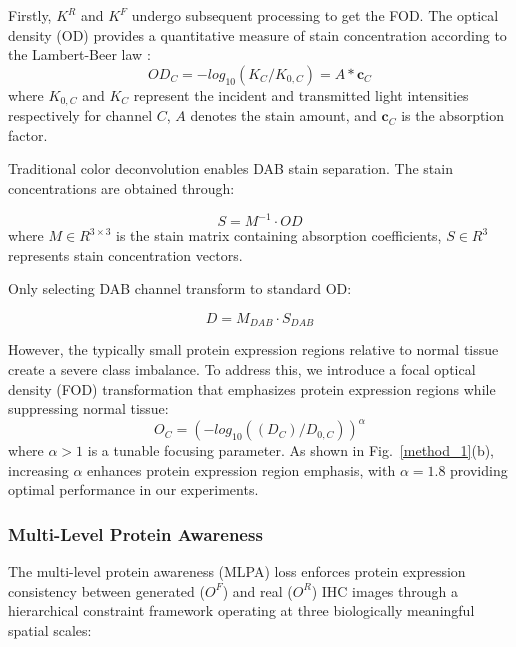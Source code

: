 \documentclass[journal,twoside,web]{ieeecolor}
\begin{document}
Firstly, $K^R$ and $K^F$ undergo subsequent processing to get the FOD.
The optical density (OD) provides a quantitative measure of stain concentration according to the Lambert-Beer law \cite{varghese2014ihc}:
\begin{equation}\label{OD}
    OD_C=-log_{10}(K_C/K_{0,C})=A \ast \boldsymbol{c}_C
\end{equation}
where $K_{0,C}$ and $K_C$ represent the incident and transmitted light intensities respectively for channel $C$, $A$ denotes the stain amount, and $\boldsymbol{c}_C$ is the absorption factor.


Traditional color deconvolution enables DAB stain separation. The stain concentrations are obtained through:

\begin{equation}
{S} = {M}^{-1}\cdot{OD}
\end{equation}
where ${M} \in {R}^{3\times 3}$ is the stain matrix containing absorption coefficients, ${S} \in {R}^{3}$ represents stain concentration vectors. 

Only selecting DAB channel transform to standard OD:

\begin{equation}
D = {M}_{DAB} \cdot {S}_{DAB}
\end{equation}





However, the typically small {protein expression regions relative to normal tissue create a severe class imbalance. To address this, we introduce a focal optical density (FOD) transformation that emphasizes protein expression regions while suppressing normal tissue}:%
\begin{equation}
    {O_C}=(-log_{10}((D_C)/D_{0,C}))^{\alpha}
\end{equation}
where $\alpha > 1$ is a tunable focusing parameter. As shown in Fig.~\ref{method_1}(b), increasing $\alpha$ enhances {protein expression region }emphasis, with $\alpha=1.8$ providing optimal performance in our experiments.

\subsubsection{Multi-Level Protein Awareness}
The multi-level protein awareness (MLPA) loss enforces protein expression consistency between generated ($O^F$) and real ($O^R$) IHC images through a hierarchical constraint framework operating at three biologically meaningful spatial scales:
\end{document}

